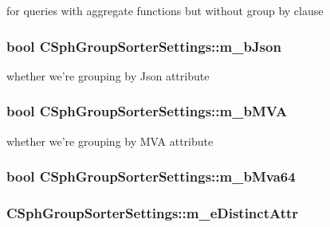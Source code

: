 for queries with aggregate functions but without group by clause 

\hypertarget{structCSphGroupSorterSettings_a62e864860985d58566bfe3891aeaad59}{
\subsubsection[{m\-\_\-b\-Json}]{\setlength{\rightskip}{0pt plus 5cm}bool C\-Sph\-Group\-Sorter\-Settings\-::m\-\_\-b\-Json}}\label{structCSphGroupSorterSettings_a62e864860985d58566bfe3891aeaad59}


whether we're grouping by Json attribute 

\hypertarget{structCSphGroupSorterSettings_ac863dda0135c99dafcad40707d1301f7}{
\subsubsection[{m\-\_\-b\-M\-V\-A}]{\setlength{\rightskip}{0pt plus 5cm}bool C\-Sph\-Group\-Sorter\-Settings\-::m\-\_\-b\-M\-V\-A}}\label{structCSphGroupSorterSettings_ac863dda0135c99dafcad40707d1301f7}


whether we're grouping by M\-V\-A attribute 

\hypertarget{structCSphGroupSorterSettings_a6df446a75ac8695a79549585708c43b3}{
\subsubsection[{m\-\_\-b\-Mva64}]{\setlength{\rightskip}{0pt plus 5cm}bool C\-Sph\-Group\-Sorter\-Settings\-::m\-\_\-b\-Mva64}}\label{structCSphGroupSorterSettings_a6df446a75ac8695a79549585708c43b3}
\hypertarget{structCSphGroupSorterSettings_a5cf4da17e82a9183dece0b40442bf6a8}{
\subsubsection[{m\-\_\-e\-Distinct\-Attr}]{ C\-Sph\-Group\-Sorter\-Settings\-::m\-\_\-e\-Distinct\-Attr}}\label{structCSphGroupSorterSettings_a5cf4da17e82a9183dece0b40442bf6a8}


